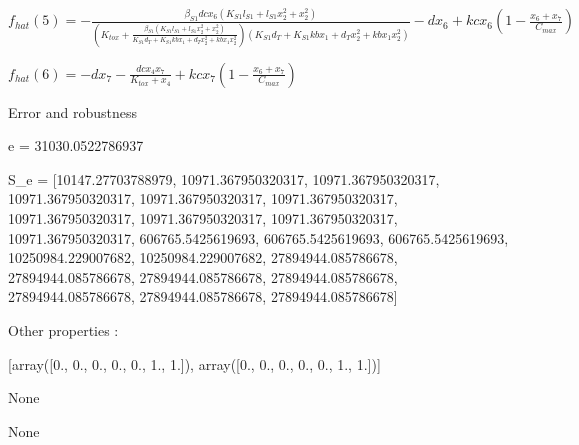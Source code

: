 $f_{hat}(5)=- \frac{\beta_{S1} dc x_{6} \left(K_{S1} l_{S1} + l_{S1} x_{2}^{2} + x_{2}^{2}\right)}{\left(K_{tox} + \frac{\beta_{S1} \left(K_{S1} l_{S1} + l_{S1} x_{2}^{2} + x_{2}^{2}\right)}{K_{S1} d_{T} + K_{S1} kb x_{1} + d_{T} x_{2}^{2} + kb x_{1} x_{2}^{2}}\right) \left(K_{S1} d_{T} + K_{S1} kb x_{1} + d_{T} x_{2}^{2} + kb x_{1} x_{2}^{2}\right)} - d x_{6} + kc x_{6} \left(1 - \frac{x_{6} + x_{7}}{C_{max}}\right)$


$f_{hat}(6)=- d x_{7} - \frac{dc x_{4} x_{7}}{K_{tox} + x_{4}} + kc x_{7} \left(1 - \frac{x_{6} + x_{7}}{C_{max}}\right)$



Error and robustness 


e = 31030.0522786937

S_e = [10147.27703788979, 10971.367950320317, 10971.367950320317, 10971.367950320317, 10971.367950320317, 10971.367950320317, 10971.367950320317, 10971.367950320317, 10971.367950320317, 10971.367950320317, 606765.5425619693, 606765.5425619693, 606765.5425619693, 10250984.229007682, 10250984.229007682, 27894944.085786678, 27894944.085786678, 27894944.085786678, 27894944.085786678, 27894944.085786678, 27894944.085786678, 27894944.085786678]

Other properties :


[array([0., 0., 0., 0., 0., 1., 1.]), array([0., 0., 0., 0., 0., 1., 1.])]

None

None

